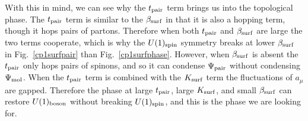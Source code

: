 \documentclass[prb,twocolumn]{revtex4-1}
\begin{document}
With this in mind, we can see why the $t_{\rm pair}$ term brings us into the topological phase.
The $t_{\rm pair}$ term is similar to the $\beta_{\rm surf}$ in that it is also a hopping term, though it hops pairs of partons. Therefore when both $t_{\rm pair}$ and $\beta_{\rm surf}$ are large the two terms cooperate, which is why the $U(1)_{\rm spin}$ symmetry breaks at lower $\beta_{\rm surf}$ in Fig.~\ref{cp1surfpair} than Fig.~\ref{cp1surfphase}. However, when $\beta_{\rm surf}$ is absent the $t_{\rm pair}$ only hops pairs of spinons, and so it can condense $\Psi_{\rm pair}$ without condensing $\Psi_{\rm mol}$. When the $t_{\rm pair}$ term is combined with the $K_{\rm surf}$ term the fluctuations of $a_\mu$ are gapped. Therefore the phase at large $t_{\rm pair}$, large $K_{\rm surf}$, and small $\beta_{\rm surf}$ can restore $U(1)_{\rm boson}$ without breaking $U(1)_{\rm spin}$, and this is the phase we are looking for.


\end{document}
